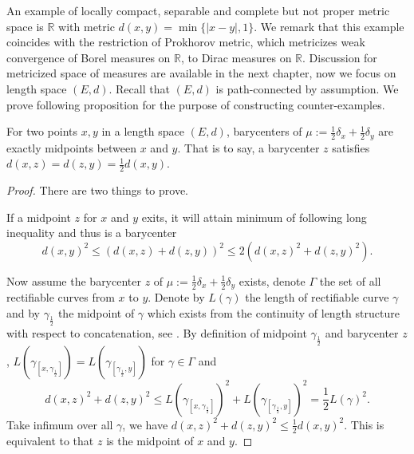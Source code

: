 
An example of locally compact,
separable and complete but not proper metric space is $\mathbb{R}$ with metric $d(x,y)=\min\{|x-y|,1\}$.
We remark that this example coincides with the restriction of Prokhorov metric, which metricizes weak convergence of Borel measures on $\mathbb{R}$, to Dirac measures on $\mathbb{R}$.
Discussion for metricized space of measures are available in the next chapter,
now we focus on length space $(E,d)$. Recall that $(E,d)$ is path-connected by assumption.
We prove following proposition for the purpose of constructing counter-examples.

\begin{prop}
	\label{prop:barycenter_midpoint}
	For two points $x,y$ in a length space $(E,d)$, barycenters of $\mu:=\frac{1}{2}\delta_x + \frac{1}{2}\delta_y$ are exactly midpoints between $x$ and $y$.
	That is to say, a barycenter $z$ satisfies $d(x,z)=d(z,y)=\frac{1}{2}d(x,y)$.
\end{prop}

\begin{proof}
	There are two things to prove.

	If a midpoint $z$ for $x$ and $y$ exits,
	it will attain minimum of following long inequality and thus is a barycenter
	\[
		d(x,y)^2 \leq \left(d(x,z) + d(z,y)\right)^2 \leq 2\left(d(x,z)^2+ d(z,y)^2\right).
	\]

	Now assume the barycenter $z$ of $\mu:=\frac{1}{2}\delta_x + \frac{1}{2} \delta_y$ exists,
	denote $\Gamma$ the set of all rectifiable curves from $x$ to $y$.
	Denote by $L(\gamma)$ the length of rectifiable curve $\gamma$
	and by $\gamma_\frac{1}{2}$ the midpoint of $\gamma$ which exists from the continuity of length
	structure with respect to concatenation, see .
	By definition of midpoint $\gamma_{\frac{1}{2}}$ and barycenter $z$,
	$L(\gamma_{[x, \gamma_\frac{1}{2}]}) = L(\gamma_{[\gamma_\frac{1}{2}, y]})$ for $\gamma \in \Gamma$ and
	\[
		d(x,z)^2 + d(z,y)^2 \leq {L(\gamma_{[x, \gamma_\frac{1}{2}]})}^2 + {L(\gamma_{[\gamma_\frac{1}{2}, y]})}^2=\frac{1}{2} {L(\gamma)}^2.
	\]
	Take infimum over all $\gamma$, we have $d(x,z)^2 + d(z,y)^2 \leq \frac{1}{2}d(x,y)^2$.
	This is equivalent to that $z$ is the midpoint of $x$ and $y$.
\end{proof}

